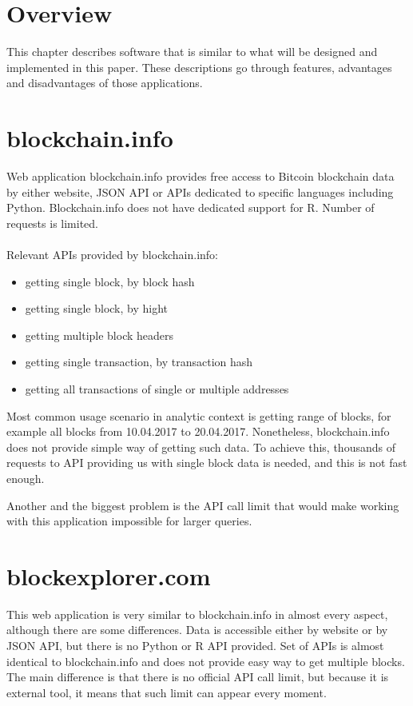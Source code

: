 \documentclass[12pt, en, eng, oneside]{mgr}
\begin{document}
\section{Overview}
This chapter describes software that is similar to what will be designed and implemented in this paper. These descriptions go through features, advantages and disadvantages of those applications. 

\section{blockchain.info}

Web application blockchain.info provides free access to Bitcoin blockchain data by either website, JSON API or APIs dedicated to specific languages including Python. Blockchain.info does not have dedicated support for R. Number of requests is limited.
\\
\\
Relevant APIs provided by blockchain.info:
\begin{itemize}
\item
getting single block, by block hash
\item
getting single block, by hight
\item
getting multiple block headers
\item
getting single transaction, by transaction hash
\item
getting all transactions of single or multiple addresses


\end{itemize}

Most common usage scenario in analytic context is getting range of blocks, for example all blocks from 10.04.2017 to 20.04.2017. Nonetheless, blockchain.info does not provide simple way of getting such data. To achieve this, thousands of requests to API providing us with single block data is needed, and this is not fast enough.

Another and the biggest problem is the API call limit that would make working with this application impossible for larger queries.

\section{blockexplorer.com}

This web application is very similar to blockchain.info in almost every aspect, although there are some differences. Data is accessible either by website or by JSON API, but there is no Python or R API provided. Set of APIs is almost identical to blockchain.info and does not provide easy way to get multiple blocks. The main difference is that there is no official API call limit, but because it is external tool, it means that such limit can appear every moment.
\end{document}
